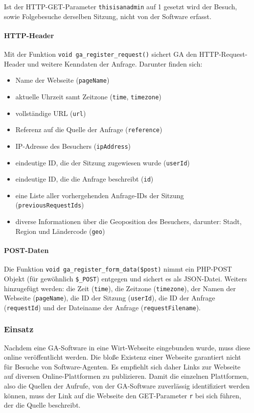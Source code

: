 Ist der HTTP-GET-Parameter \texttt{thisisanadmin} auf 1 gesetzt wird der
Besuch, sowie Folgebesuche derselben Sitzung, nicht von der Software
erfasst.

\paragraph{HTTP-Header} %
\label{par:ga_http_header}
Mit der Funktion \texttt{void\ ga\_register\_request()} sichert GA den
HTTP-Request-Header und weitere Kenndaten der Anfrage. Darunter finden
sich:

\begin{itemize}
\item
  Name der Webseite (\texttt{pageName})
\item
  aktuelle Uhrzeit samt Zeitzone (\texttt{time}, \texttt{timezone})
\item
  vollständige URL (\texttt{url})
\item
  Referenz auf die Quelle der Anfrage (\texttt{reference})
\item
  IP-Adresse des Besuchers (\texttt{ipAddress})
\item
  eindeutige ID, die der Sitzung zugewiesen wurde (\texttt{userId})
\item
  eindeutige ID, die die Anfrage beschreibt (\texttt{id})
\item
  eine Liste aller vorhergehenden Anfrage-IDs der Sitzung
  (\texttt{previousRequestIds})
\item
  diverse Informationen über die Geoposition des Besuchers, darunter:
  Stadt, Region und Ländercode (\texttt{geo})
\end{itemize}

\paragraph{POST-Daten} %
\label{par:ga_post_daten}
Die Funktion \texttt{void\ ga\_register\_form\_data(\$post)} nimmt ein
PHP-POST Objekt (für gewöhnlich \texttt{\$\_POST}) entgegen und sichert
es als JSON-Datei. Weiters hinzugefügt werden: die Zeit (\texttt{time}),
die Zeitzone (\texttt{timezone}), der Namen der Webseite
(\texttt{pageName}), die ID der Sitzung (\texttt{userId}), die ID der
Anfrage (\texttt{requestId}) und der Dateiname der Anfrage
(\texttt{requestFilename}).

\subsubsection{Einsatz} %
\label{ssub:ga_einsatz}
Nachdem eine GA-Software in eine Wirt-Webseite eingebunden wurde, muss
diese online veröffentlicht werden. Die bloße Existenz einer Webseite
garantiert nicht für Besuche von Software-Agenten. Es empfiehlt sich
daher Links zur Webseite auf diversen Online-Plattformen zu publizieren.
Damit die einzelnen Plattformen, also die Quellen der Aufrufe, von der
GA-Software zuverlässig identifiziert werden können, muss der Link auf
die Webseite den GET-Parameter \texttt{r} bei sich führen, der die
Quelle beschreibt.

